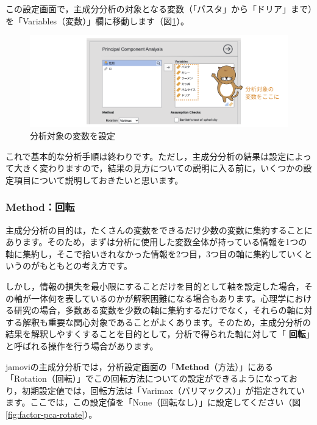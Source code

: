 \documentclass[
  12pt,
  a5jpaper,
  lualatex, ja=standard]{bxjsbook}
\renewcommand{\emph}[1]{\textbf{\color{emph} #1}}
\begin{document}
この設定画面で，主成分分析の対象となる変数（「パスタ」から「ドリア」まで）を「Variables（変数）」欄に移動します（図\ref{fig:factor-pca-set-var}）。

\begin{figure}[!ht]

{\centering \includegraphics[width=1\linewidth]{images/factor/pca-set-var} 

}

\caption{分析対象の変数を設定}\label{fig:factor-pca-set-var}
\end{figure}

これで基本的な分析手順は終わりです。ただし，主成分分析の結果は設定によって大きく変わりますので，結果の見方についての説明に入る前に，いくつかの設定項目について説明しておきたいと思います。

\hypertarget{subsub:factor-pca-method}{%
\subsubsection*{Method：回転}\label{subsub:factor-pca-method}}

主成分分析の目的は，たくさんの変数をできるだけ少数の変数に集約することにあります。そのため，まずは分析に使用した変数全体が持っている情報を1つの軸に集約し，そこで拾いきれなかった情報を2つ目，3つ目の軸に集約していくというのがもともとの考え方です。

しかし，情報の損失を最小限にすることだけを目的として軸を設定した場合，その軸が一体何を表しているのかが解釈困難になる場合もあります。心理学における研究の場合，多数ある変数を少数の軸に集約するだけでなく，それらの軸に対する解釈も重要な関心対象であることがよくあります。そのため，主成分分析の結果を解釈しやすくすることを目的として，分析で得られた軸に対して「\emph{回転}」と呼ばれる操作を行う場合があります。

jamoviの主成分分析では，分析設定画面の「\textbf{Method}（方法）」にある「Rotation（回転）」でこの回転方法についての設定ができるようになっており，初期設定値では，回転方法は「Varimax（バリマックス）」が指定されています。ここでは，この設定値を「None（回転なし）」に設定してください（図\ref{fig:factor-pca-rotate}）。
\end{document}
